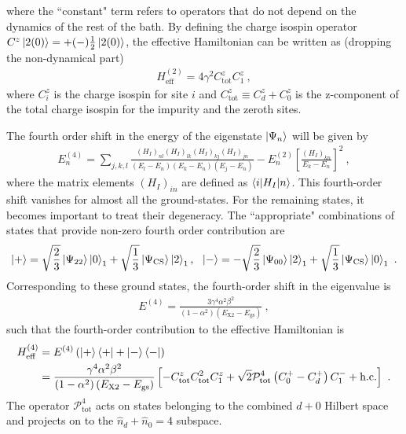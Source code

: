 where the ``constant" term refers to operators that do not depend on the dynamics of the rest of the bath. By defining the charge isospin operator \(C^z\ket{2(0)} = +(-)\frac{1}{2}\ket{2(0)}\), the effective Hamiltonian can be written as (dropping the non-dynamical part)
\begin{eqnarray}
	H_\text{eff}^{(2)} = 4\gamma^2C_\text{tot}^z  C_1^z~,
\end{eqnarray}
where \(C_i^z\) is the charge isospin for site \(i\) and \(C_\text{tot}^z \equiv C_d^z + C_0^z\) is the z-component of the total charge isospin for the impurity and the zeroth sites.

The fourth order shift in the energy of the eigenstate \(\ket{\Psi_n}\) will be given by
\begin{eqnarray}
	E_{n}^{(4)} = \sum_{j,k,l} \frac{\left(H_I\right)_{nl}\left(H_I\right)_{lk}\left(H_I\right)_{kj}\left(H_I\right)_{jn}}{\left( E_l - E_n \right)\left( E_k - E_n \right)\left( E_j - E_n \right) } - E_n^{(2)} \left[\frac{\left(H_I\right)_{kn}}{E_k - E_n}\right]^2~,
\end{eqnarray}
where the matrix elements \(\left( H_I \right)_{in} \) are defined as \(\braket{i | H_I | n}\). This fourth-order shift vanishes for almost all the ground-states. For the remaining states, it becomes important to treat their degeneracy. The ``appropriate" combinations of states that provide non-zero fourth order contribution are
\begin{eqnarray}
	\ket{+} = \sqrt{\frac{2}{3}}\ket{\Psi_{22}}\ket{0}_1 + \sqrt{\frac{1}{3}}\ket{\Psi_\text{CS}}\ket{2}_1, ~ ~\ket{-} = -\sqrt{\frac{2}{3}}\ket{\Psi_{00}}\ket{2}_1 + \sqrt{\frac{1}{3}}\ket{\Psi_\text{CS}}\ket{0}_1~.
\end{eqnarray}
Corresponding to these ground states, the fourth-order shift in the eigenvalue is
\begin{eqnarray}
	E^{(4)} = \frac{3\gamma^4 \alpha^2 \beta^2}{\left( 1 - \alpha^2 \right) \left( E_\text{X2} - E_\text{gs} \right) }~,
\end{eqnarray}
such that the fourth-order contribution to the effective Hamiltonian is
\begin{eqnarray}
	H_\text{eff}^{(4)} &= E^{(4)}\left(\ket{+}\bra{+} + \ket{-}\bra{-}\right) \nonumber\\
			   &= \frac{\gamma^4 \alpha^2 \beta^2}{\left( 1 - \alpha^2 \right) \left( E_\text{X2} - E_\text{gs} \right) } \left[- C_\text{tot}^z C_\text{tot}^2 C_1^z +\sqrt{2}\mathcal{P}_\text{tot}^{4}\left(C_0^+ - C_d^+\right)C_1^- + \text{h.c.}\right] ~.
\end{eqnarray}
The operator \(\mathcal{P}_\text{tot}^{4}\) acts on states belonging to the combined \(d+0\) Hilbert space and projects on to the \(\hat n_d + \hat n_0 = 4\) subspace.



